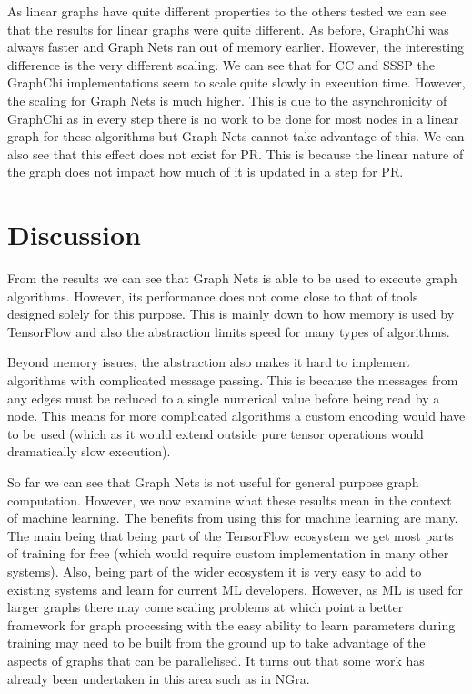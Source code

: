 \documentclass[sigconf,nonacm]{acmart}
\begin{document}
As linear graphs have quite different properties to the others tested we can see that the results for linear graphs were quite different. As before, GraphChi was always faster and Graph Nets ran out of memory earlier. However, the interesting difference is the very different scaling. We can see that for CC and SSSP the GraphChi implementations seem to scale quite slowly in execution time. However, the scaling for Graph Nets is much higher. This is due to the asynchronicity of GraphChi as in every step there is no work to be done for most nodes in a linear graph for these algorithms but Graph Nets cannot take advantage of this. We can also see that this effect does not exist for PR. This is because the linear nature of the graph does not impact how much of it is updated in a step for PR.

\section{Discussion}

From the results we can see that Graph Nets is able to be used to execute graph algorithms. However, its performance does not come close to that of tools designed solely for this purpose. This is mainly down to how memory is used by TensorFlow and also the abstraction limits speed for many types of algorithms.

Beyond memory issues, the abstraction also makes it hard to implement algorithms with complicated message passing. This is because the messages from any edges must be reduced to a single numerical value before being read by a node. This means for more complicated algorithms a custom encoding would have to be used (which as it would extend outside pure tensor operations would dramatically slow execution).

So far we can see that Graph Nets is not useful for general purpose graph computation. However, we now examine what these results mean in the context of machine learning. The benefits from using this for machine learning are many. The main being that being part of the TensorFlow ecosystem we get most parts of training for free (which would require custom implementation in many other systems). Also, being part of the wider ecosystem it is very easy to add to existing systems and learn for current ML developers. However, as ML is used for larger graphs there may come scaling problems at which point a better framework for graph processing with the easy ability to learn parameters during training may need to be built from the ground up to take advantage of the aspects of graphs that can be parallelised. It turns out that some work has already been undertaken in this area such as in NGra\cite{better-graph-proc}.
\end{document}
